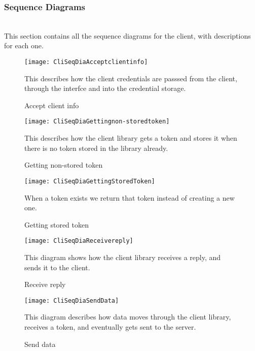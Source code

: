 	\subsubsection{Sequence Diagrams}\label{client sequence diagrams}\\
This section contains all the sequence diagrams for the client, with descriptions for each one.
		\begin{figure}[H]
			\centering	
			\texttt{[image: CliSeqDiaAcceptclientinfo]}
			\caption{Accept client info}
			This describes how the client credentials are passsed from the client, through the interfce and into the credential storage.
			\label{fig:CliSeqDiaAcceptclientinfo}
		\end{figure}
		\begin{figure}[H]
			\centering	
			\texttt{[image: CliSeqDiaGettingnon-storedtoken]}
			\caption{Getting non-stored token}
			This describes how the client library gets a token and stores it when there is no token stored in the library already. 
			\label{fig:CliSeqDiaGettingnon-storedtoken}
		\end{figure}
		\begin{figure}[H]
			\centering	
			\texttt{[image: CliSeqDiaGettingStoredToken]}
			\caption{Getting stored token}
			When a token exists we return that token instead of creating a new one. 
			\label{fig:CliSeqDiaGettingStoredToken}
		\end{figure}
		\begin{figure}[H]
			\centering	
			\texttt{[image: CliSeqDiaReceivereply]}
			\caption{Receive reply}
			This diagram shows how the client library receives a reply, and sends it to the client. 
			\label{fig:CliSeqDiaReceivereply}
		\end{figure}
		\begin{figure}[H]
			\centering	
			\texttt{[image: CliSeqDiaSendData]}
			\caption{Send data}
			This diagram describes how data moves through the client library, receives a token, and eventually gets sent to the server. 
			\label{fig:CliSeqDiaSendData}
		\end{figure}

		

